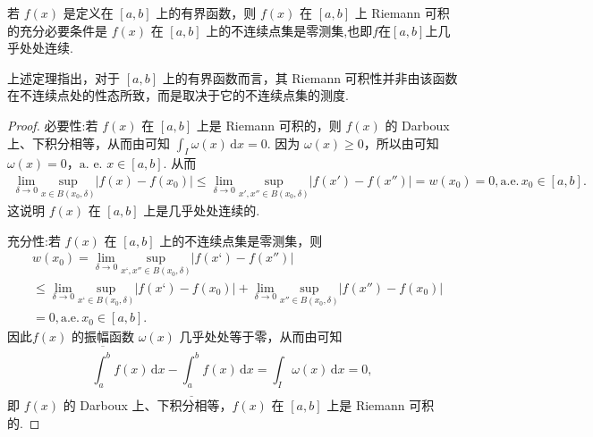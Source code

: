 \documentclass[../../main.tex]{subfiles}%
\begin{document}
\begin{theorem}[Riemann可积的充要条件]\label{theorem:Riemann可积的充要条件-Riemann可积等价几乎处处连续}
若 \( f(x) \) 是定义在 \( [a,b] \) 上的有界函数，则 \( f(x) \) 在 \( [a,b] \) 上 Riemann 可积的充分必要条件是 \( f(x) \) 在 \( [a,b] \) 上的不连续点集是零测集,也即$f$在$[a,b]$上几乎处处连续.
\end{theorem}
\begin{remark}
上述定理指出，对于 \( [a,b] \) 上的有界函数而言，其 Riemann 可积性并非由该函数在不连续点处的性态所致，而是取决于它的不连续点集的测度.
\end{remark}
\begin{proof}

{\heiti 必要性:}若 \( f(x) \) 在 \( [a,b] \) 上是 Riemann 可积的，则 \( f(x) \) 的 Darboux 上、下积分相等，从而由可知 \( \int_I \omega(x) \, \mathrm{d}x = 0 \). 因为 \( \omega(x) \geqslant  0 \)，所以由可知\( \omega(x) = 0 \)，\(\text{a. e.}\) \( x \in [a,b] \). 从而
\begin{align*}
\underset{\delta \rightarrow 0}{\lim}\underset{x\in B\left( x_0,\delta \right)}{\mathrm{sup}}|f(x)-f(x_0)|\leqslant \underset{\delta \rightarrow 0}{\lim}\underset{x',x'' \in B\left( x_0,\delta \right)}{\mathrm{sup}}|f\left( x' \right) -f\left( x'' \right) |=w(x_0)=0,\mathrm{a}.\mathrm{e}.\,x_0\in \left[ a,b \right] .
\end{align*}
这说明 \( f(x) \) 在 \( [a,b] \) 上是几乎处处连续的.

{\heiti 充分性:}若 \( f(x) \) 在 \( [a,b] \) 上的不连续点集是零测集，则
\begin{align*}
&w(x_0)=\underset{\delta \rightarrow 0}{\lim}\underset{x‘,x'' \in B\left( x_0,\delta \right)}{\mathrm{sup}}|f\left( x‘\right) -f\left( x'' \right) |
\\
&\leqslant \underset{\delta \rightarrow 0}{\lim}\underset{x‘\in B\left( x_0,\delta \right)}{\mathrm{sup}}|f(x‘)-f(x_0)|+\underset{\delta \rightarrow 0}{\lim}\underset{x'' \in B\left( x_0,\delta \right)}{\mathrm{sup}}|f(x'' )-f(x_0)|
\\
&=0,\mathrm{a}.\mathrm{e}.\,x_0\in \left[ a,b \right] .
\end{align*}
因此\( f(x) \) 的振幅函数 \( \omega(x) \) 几乎处处等于零，从而由可知
\[
\overline{\int_a^b} f(x) \, \mathrm{d}x - \underline{\int_a^b} f(x) \, \mathrm{d}x = \int_I \omega(x) \, \mathrm{d}x = 0,
\]
即 \( f(x) \) 的 Darboux 上、下积分相等，\( f(x) \) 在 \( [a,b] \) 上是 Riemann 可积的.
\end{proof}
\end{document}

